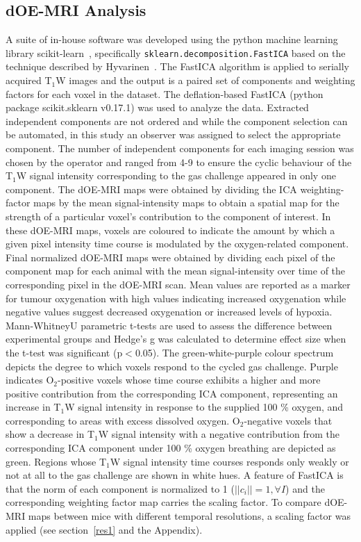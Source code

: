 \subsection{\ac{dOE-MRI} Analysis}
A suite of in-house software was developed using the python machine learning library scikit-learn~\cite{Pedregosa:2011tv}, specifically \texttt{sklearn.decomposition.Fast\ac{ICA}} based on the technique described by Hyvarinen~\cite{Hyvarinen:2000vk}.
The Fast\ac{ICA} algorithm is applied to serially acquired T$_1$W images and the output is a paired set of components and weighting factors for each voxel in the dataset.
The deflation-based Fast\ac{ICA} (python package scikit.sklearn v0.17.1) was used to analyze the data. 
Extracted independent components are not ordered and while the component selection can be automated, in this study an observer was assigned to select the appropriate component.
The number of independent components for each imaging session was chosen by the operator and ranged from 4-9 to ensure the cyclic behaviour of the T$_1$W signal intensity corresponding to the gas challenge appeared in only one component. 
The \ac{dOE-MRI} maps were obtained by dividing the \ac{ICA} weighting-factor maps by the mean signal-intensity maps to obtain a spatial map for the strength of a particular voxel's contribution to the component of interest.
In these \ac{dOE-MRI} maps, voxels are coloured to indicate the amount by which a given pixel intensity time course is modulated by the oxygen-related component. 
Final normalized \ac{dOE-MRI} maps were obtained by dividing each pixel of the component map for each animal with the mean signal-intensity over time of the corresponding pixel in the \ac{dOE-MRI} scan. 
Mean values are reported as a marker for tumour oxygenation with high values indicating increased oxygenation while negative values suggest decreased oxygenation or increased levels of hypoxia. 
Mann-WhitneyU parametric t-tests are used to assess the difference between experimental groups and Hedge's g was calculated to determine effect size when the t-test was significant (p$<$0.05).
The green-white-purple colour spectrum depicts the degree to which voxels respond to the cycled gas challenge.
Purple indicates O$_2$-positive voxels whose time course exhibits a higher and more positive contribution from the corresponding \ac{ICA} component, representing an increase in T$_1$W signal intensity in response to the supplied 100 \% oxygen, and corresponding to areas with excess dissolved oxygen. 
O$_2$-negative voxels that show a decrease in T$_1$W signal intensity with a negative contribution from the corresponding \ac{ICA} component under 100 \% oxygen breathing are depicted as green. 
Regions whose T$_1$W signal intensity time courses responds only weakly or not at all to the gas challenge are shown in white hues.
A feature of Fast\ac{ICA} is that the norm of each component is normalized to 1 ($||c_i||=1, \forall I$) and the corresponding weighting factor map carries the scaling factor.
To compare \ac{dOE-MRI} maps between mice with different temporal resolutions, a scaling factor was applied (see section~\ref{res1} and the Appendix).

